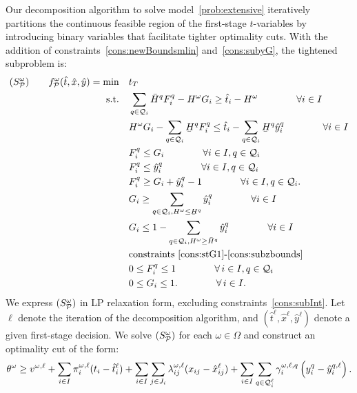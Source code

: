 \documentclass[11pt]{article}
\newcommand{\cQ}{{\cal Q}}
\newcommand{\cP}{{\cal P}}
\renewcommand{\underbar}{\underaccent{\bar}}
\begin{document}
	Our decomposition algorithm to solve model~\eqref{prob:extensive} iteratively partitions the continuous feasible region of the first-stage $t$-variables by introducing binary variables that facilitate tighter optimality cuts. With the addition of constraints~\eqref{cons:newBoundsmlin} and~\eqref{cons:subyG}, the tightened subproblem is: 
	\begin{subequations}
		\label{prob:subTightened}
		\begin{align}
		(S_{\cP}^\omega) \qquad f^\omega_{\cP}(\hat{t},\hat{x},\hat{y}) = \min \quad & t_T \\
		\text{s.t.} \quad & \sum_{q \in \cQ_i} \bar{H}^q F_i^q - H^\omega G_i \geq \hat{t}_i - H^\omega \qquad \qquad \forall i \in I \label{cons:sFG1t}\\
		& H^\omega G_i - \sum_{q \in \cQ_i} \underbar{H}^q F_i^q \leq \hat{t}_i - \sum_{q \in \cQ_i} \underbar{H}^q \hat{y}_i^q \qquad \qquad \forall i \in I \label{cons:sFG2t}\\
		& F_i^q \leq G_i \qquad \qquad \forall i \in I, q \in \cQ_i \label{cons:sFGlin1t}\\
		& F_i^q \leq \hat{y}_i^q \qquad \qquad \forall i \in I, q \in \cQ_i \label{cons:sFGlin2t}\\
		& F_i^q \geq G_i + \hat{y}_i^q - 1 \qquad \qquad \forall i \in I, q \in \cQ_i. \label{cons:sFGlin3t}\\
		& G_i \geq \sum_{q \in \cQ_i, H^\omega \leq \underbar{H}^q} \hat{y}_i^q \qquad \qquad \forall i \in I \label{cons:syG1t}\\
		& G_i \leq 1 - \sum_{q \in \cQ_i, H^\omega \geq \bar{H}^q} \hat{y}_i^q \qquad \qquad \forall i \in I \label{cons:syG2t}\\
	    & \text{constraints~\eqref{cons:stG1}-\eqref{cons:subzbounds}} \\
		& 0 \leq F_i^q \leq 1 \qquad \qquad \forall \,i \in I, q \in \cQ_i\\
		& 0 \leq G_i \leq 1. \qquad \qquad \forall \,i \in I. \label{cons:G01t}
		\end{align}
	\end{subequations}
	We express $(S_{\cP}^\omega)$ in LP relaxation form, excluding constraints~\eqref{cons:subInt}. Let $\ell$ denote the iteration of the decomposition algorithm, and $(\hat{t}^\ell,\hat{x}^\ell,\hat{y}^\ell)$ denote a given first-stage decision. We solve \((S_{\cP}^\omega)\) for each \(\omega \in \Omega\) and construct an optimality cut of the form:
	\begin{equation} \label{cons:cut}
		\theta^\omega \geq v^{\omega,\ell} + \sum_{i \in I} \pi_i^{\omega,\ell} (t_i - \hat{t}_i^{\ell}) + \sum_{i \in I} \sum_{j \in J_i} \lambda_{ij}^{\omega,\ell} (x_{ij} - \hat{x}_{ij}^{\ell}) + \sum_{i \in I} \sum_{q \in \cQ^{\ell}_i} {\gamma_{i}^{\omega,\ell,q}} \left( y_i^{q} - \hat{y}_i^{q,\ell} \right).
	\end{equation}
\end{document}
